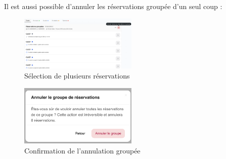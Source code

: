 \documentclass[a4paper,12pt]{article}
\begin{document}
Il est aussi possible d’annuler les réservations groupée d’un seul coup :

\begin{figure}[h!]
    \centering
    \includegraphics[width=0.5\textwidth]{UTILISATEUR/CANCEL_BOOKS_GROUP.png}
    \caption{Sélection de plusieurs réservations}
\end{figure}

\begin{figure}[h!]
    \centering
    \includegraphics[width=0.5\textwidth]{UTILISATEUR/CANCEL_BOOKS_GROUP_CONFIRM.png}
    \caption{Confirmation de l’annulation groupée}
\end{figure}
\end{document}
